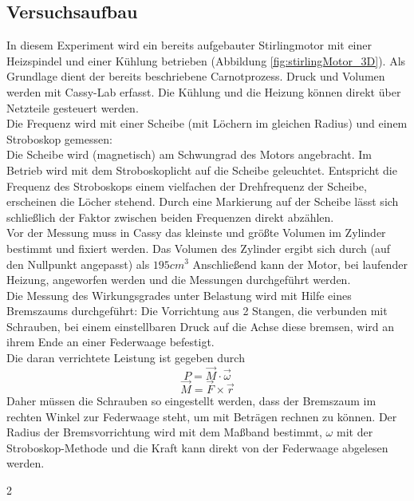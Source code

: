 \documentclass[12pt,a4paper]{article}
\begin{document}
\begin{multicols}{2}
\subsection{Versuchsaufbau}
In diesem Experiment wird ein bereits aufgebauter Stirlingmotor mit einer Heizspindel und einer Kühlung betrieben (Abbildung  \ref{fig:stirlingMotor_3D}). Als Grundlage dient der bereits beschriebene Carnotprozess. Druck und Volumen werden mit Cassy-Lab erfasst. Die Kühlung und die Heizung können direkt über Netzteile gesteuert werden.\\
Die Frequenz wird  mit einer Scheibe (mit Löchern im gleichen Radius) und einem Stroboskop gemessen:\\
Die Scheibe wird (magnetisch) am Schwungrad des Motors angebracht. Im Betrieb wird mit dem Stroboskoplicht auf die Scheibe geleuchtet. Entspricht die Frequenz des Stroboskops einem vielfachen der Drehfrequenz der Scheibe, erscheinen die Löcher stehend. Durch eine Markierung auf der Scheibe lässt sich schließlich der Faktor zwischen beiden Frequenzen direkt abzählen.
\\
Vor der Messung muss in Cassy das kleinste und größte Volumen im Zylinder bestimmt und fixiert werden.
Das Volumen des Zylinder ergibt sich durch (auf den Nullpunkt angepasst) als $195cm^3$
Anschließend kann der Motor, bei laufender Heizung, angeworfen werden und die Messungen durchgeführt werden.\\

Die Messung des Wirkungsgrades unter Belastung wird mit Hilfe eines Bremszaums durchgeführt: Die Vorrichtung aus 2 Stangen, die verbunden mit Schrauben, bei einem einstellbaren Druck auf die Achse diese bremsen, wird an ihrem Ende an einer Federwaage befestigt.\\
Die daran verrichtete Leistung ist gegeben durch
$$P=\vec{M}\cdot \vec{\omega}$$
$$\vec{M}=\vec{F}\times \vec{r}$$
Daher müssen die Schrauben so eingestellt werden, dass der Bremszaum im rechten Winkel zur Federwaage steht, um mit Beträgen rechnen zu können. Der Radius der Bremsvorrichtung wird mit dem Maßband bestimmt, $\omega$ mit der Stroboskop-Methode und die Kraft kann direkt von der Federwaage abgelesen werden.

\end {multicols}{2}
\end{document}
